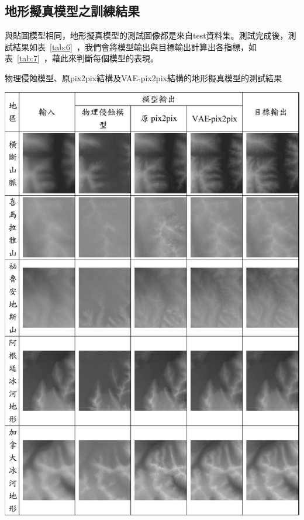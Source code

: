 \documentclass[a4paper, 12pt]{article}
\begin{document}
\subsection{地形擬真模型之訓練結果}
與貼圖模型相同，地形擬真模型的測試圖像都是來自test資料集。測試完成後，測試結果如表~\ref{tab:6}~，我們會將模型輸出與目標輸出計算出各指標，如表~\ref{tab:7}~，藉此來判斷每個模型的表現。
\begin{table}[htbp]
    \centering
    \caption{物理侵蝕模型、原pix2pix結構及VAE-pix2pix結構的地形擬真模型的測試結果}
    \label{tab:6}
    \includegraphics[width=0.8\linewidth]{fig/tab6.jpg}
\end{table}
\end{document}
